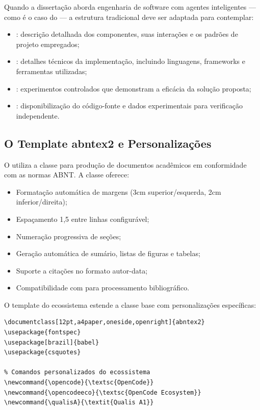 Quando a dissertação aborda engenharia de software com agentes inteligentes ---
como é o caso do \opencodeeco{} --- a estrutura tradicional deve ser adaptada
para contemplar:

\begin{itemize}
\item {}: descrição detalhada dos componentes,
      suas interações e os padrões de projeto empregados;
\item {}: detalhes técnicos da implementação, incluindo
      linguagens, frameworks e ferramentas utilizadas;
\item {}: experimentos controlados que demonstram
      a eficácia da solução proposta;
\item {}: disponibilização do código-fonte e dados
      experimentais para verificação independente.
\end{itemize}

\subsection{O Template abntex2 e Personalizações}

O \opencodeeco{} utiliza a classe  \cite{abnt2023nbr14724}
para produção de documentos acadêmicos em conformidade com as normas ABNT.
A classe oferece:

\begin{itemize}
\item Formatação automática de margens (3cm superior/esquerda, 2cm inferior/direita);
\item Espaçamento 1,5 entre linhas configurável;
\item Numeração progressiva de seções;
\item Geração automática de sumário, listas de figuras e tabelas;
\item Suporte a citações no formato autor-data;
\item Compatibilidade com  para processamento bibliográfico.
\end{itemize}

O template do ecossistema estende a classe base com personalizações específicas:

\begin{lstlisting}[style=bashstyle, caption={Personalizacoes do abntex2 no OpenCode}]
% No preambulo do documento:
\documentclass[12pt,a4paper,oneside,openright]{abntex2}
\usepackage{fontspec}
\usepackage[brazil]{babel}
\usepackage{csquotes}

% Comandos personalizados do ecossistema
\newcommand{\opencode}{\textsc{OpenCode}}
\newcommand{\opencodeeco}{\textsc{OpenCode Ecosystem}}
\newcommand{\qualisA}{\textit{Qualis A1}}
\end{lstlisting}

